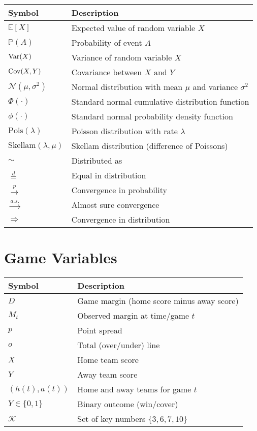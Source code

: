 \begin{tabular}{ll}
\toprule
\textbf{Symbol} & \textbf{Description} \\
\midrule
$\mathbb{E}[X]$ & Expected value of random variable $X$ \\
$\mathbb{P}(A)$ & Probability of event $A$ \\
$\mathrm{Var}(X)$ & Variance of random variable $X$ \\
$\mathrm{Cov}(X,Y)$ & Covariance between $X$ and $Y$ \\
$\mathcal{N}(\mu, \sigma^2)$ & Normal distribution with mean $\mu$ and variance $\sigma^2$ \\
$\Phi(\cdot)$ & Standard normal cumulative distribution function \\
$\phi(\cdot)$ & Standard normal probability density function \\
$\text{Pois}(\lambda)$ & Poisson distribution with rate $\lambda$ \\
$\text{Skellam}(\lambda, \mu)$ & Skellam distribution (difference of Poissons) \\
$\sim$ & Distributed as \\
$\overset{d}{=}$ & Equal in distribution \\
$\overset{p}{\to}$ & Convergence in probability \\
$\overset{a.s.}{\to}$ & Almost sure convergence \\
$\Rightarrow$ & Convergence in distribution \\
\bottomrule
\end{tabular}

\section*{Game Variables}

\begin{tabular}{ll}
\toprule
\textbf{Symbol} & \textbf{Description} \\
\midrule
$D$ & Game margin (home score minus away score) \\
$M_t$ & Observed margin at time/game $t$ \\
$p$ & Point spread \\
$o$ & Total (over/under) line \\
$X$ & Home team score \\
$Y$ & Away team score \\
$(h(t), a(t))$ & Home and away teams for game $t$ \\
$Y \in \{0,1\}$ & Binary outcome (win/cover) \\
$\mathcal{K}$ & Set of key numbers $\{3, 6, 7, 10\}$ \\
\bottomrule
\end{tabular}

